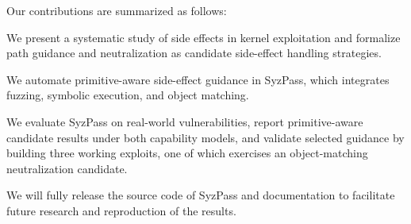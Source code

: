 
Our contributions are summarized as follows:

\squishlist
    \item \noindent We present a systematic study of side effects in kernel exploitation and formalize path guidance and neutralization as candidate side-effect handling strategies.

    \item \noindent We automate primitive-aware side-effect guidance in SyzPass, which integrates fuzzing, symbolic execution, and object matching.

    \item \noindent We evaluate SyzPass on real-world vulnerabilities, report primitive-aware candidate results under both capability models, and validate selected guidance by building three working exploits, one of which exercises an object-matching neutralization candidate.

    \item \noindent We will fully release the source code of SyzPass and documentation to facilitate future research and reproduction of the results.

\squishend







